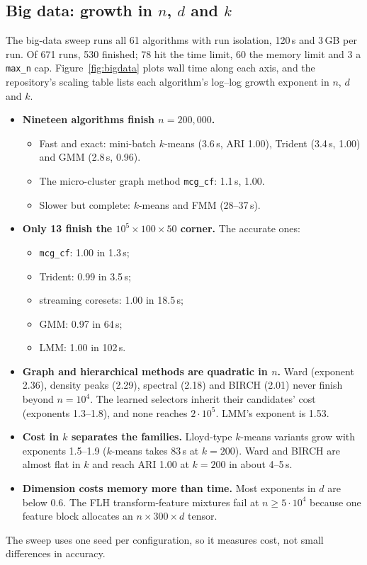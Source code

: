 \documentclass[11pt,a4paper]{article}
\newcommand{\code}[1]{\texttt{#1}}
\begin{document}
\subsection{Big data: growth in \texorpdfstring{$n$, $d$ and $k$}{n, d and k}}\label{sec:bigdata}
The big-data sweep runs all 61 algorithms with run isolation, 120\,s and 3\,GB
per run. Of 671 runs, 530 finished; 78 hit the time limit, 60 the memory
limit and 3 a \code{max\_n} cap. Figure~\ref{fig:bigdata} plots wall time
along each axis, and the repository's scaling table lists each algorithm's
log--log growth exponent in $n$, $d$ and $k$.
\begin{itemize}
  \item \textbf{Nineteen algorithms finish $n = 200{,}000$.}
  \begin{itemize}
    \item Fast and exact: mini-batch $k$-means (3.6\,s, ARI 1.00), Trident
    (3.4\,s, 1.00) and GMM (2.8\,s, 0.96).
    \item The micro-cluster graph method \code{mcg\_cf}: 1.1\,s, 1.00.
    \item Slower but complete: $k$-means and FMM (28--37\,s).
  \end{itemize}
  \item \textbf{Only 13 finish the $10^5 \times 100 \times 50$ corner.} The
  accurate ones:
  \begin{itemize}
    \item \code{mcg\_cf}: 1.00 in 1.3\,s;
    \item Trident: 0.99 in 3.5\,s;
    \item streaming coresets: 1.00 in 18.5\,s;
    \item GMM: 0.97 in 64\,s;
    \item LMM: 1.00 in 102\,s.
  \end{itemize}
  \item \textbf{Graph and hierarchical methods are quadratic in $n$.} Ward
  (exponent 2.36), density peaks (2.29), spectral (2.18) and BIRCH (2.01)
  never finish beyond $n = 10^4$. The learned selectors inherit their
  candidates' cost (exponents 1.3--1.8), and none reaches $2\cdot10^5$.
  LMM's exponent is 1.53.
  \item \textbf{Cost in $k$ separates the families.} Lloyd-type $k$-means
  variants grow with exponents 1.5--1.9 ($k$-means takes 83\,s at $k = 200$). Ward
  and BIRCH are almost flat in $k$ and reach ARI 1.00 at $k = 200$ in about
  4--5\,s.
  \item \textbf{Dimension costs memory more than time.} Most exponents in
  $d$ are below 0.6. The FLH transform-feature mixtures fail at
  $n \ge 5\cdot10^4$ because one feature block allocates an
  $n \times 300 \times d$ tensor.
\end{itemize}
The sweep uses one seed per configuration, so it measures cost, not small
differences in accuracy.
\end{document}
